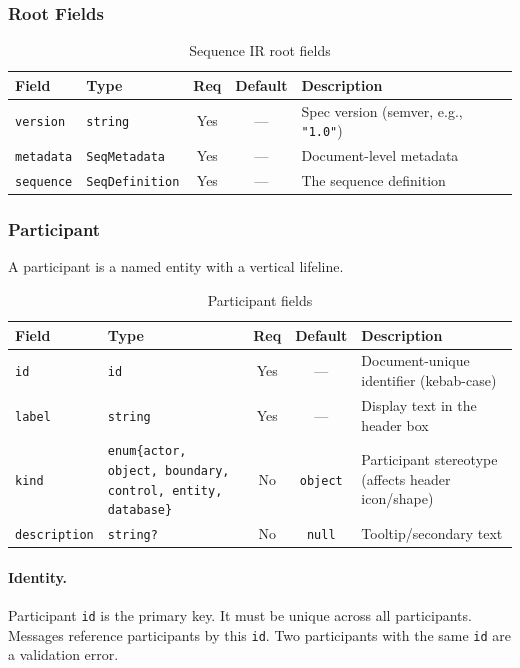 \subsubsection{Root Fields}

\begin{table}[h]
\centering
\small
\begin{tabular}{llccp{4.8cm}}
\toprule
\textbf{Field} & \textbf{Type} & \textbf{Req} & \textbf{Default} & \textbf{Description} \\
\midrule
\texttt{version} & \texttt{string} & Yes & --- & Spec version (semver, e.g., \texttt{"1.0"}) \\
\texttt{metadata} & \texttt{SeqMetadata} & Yes & --- & Document-level metadata \\
\texttt{sequence} & \texttt{SeqDefinition} & Yes & --- & The sequence definition \\
\bottomrule
\end{tabular}
\caption{Sequence IR root fields}
\label{tab:seq-root-fields}
\end{table}

\subsubsection{Participant}
\label{sec:seq-participant}

A participant is a named entity with a vertical lifeline.

\begin{table}[h]
\centering
\small
\begin{tabular}{llccp{4.5cm}}
\toprule
\textbf{Field} & \textbf{Type} & \textbf{Req} & \textbf{Default} & \textbf{Description} \\
\midrule
\texttt{id} & \texttt{id} & Yes & --- & Document-unique identifier (kebab-case) \\
\texttt{label} & \texttt{string} & Yes & --- & Display text in the header box \\
\texttt{kind} & \texttt{enum\{actor, object, boundary, control, entity, database\}} & No & \texttt{object} & Participant stereotype (affects header icon/shape) \\
\texttt{description} & \texttt{string?} & No & \texttt{null} & Tooltip/secondary text \\
\bottomrule
\end{tabular}
\caption{Participant fields}
\label{tab:seq-participant-fields}
\end{table}

\paragraph{Identity.}
Participant \texttt{id} is the primary key. It must be unique across all participants. Messages reference participants by this \texttt{id}. Two participants with the same \texttt{id} are a validation error.

